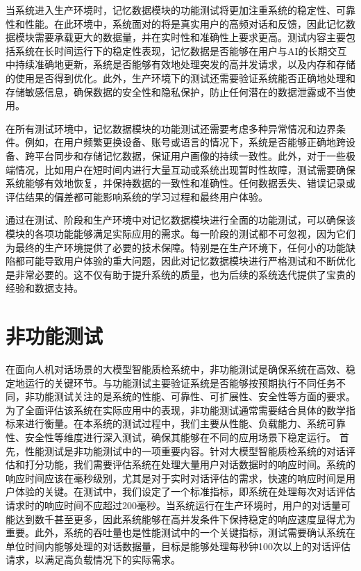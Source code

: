 当系统进入生产环境时，记忆数据模块的功能测试将更加注重系统的稳定性、可靠性和性能。在此环境中，系统面对的将是真实用户的高频对话和反馈，因此记忆数据模块需要承载更大的数据量，并在实时性和准确性上要求更高。测试内容主要包括系统在长时间运行下的稳定性表现，记忆数据是否能够在用户与AI的长期交互中持续准确地更新，系统是否能够有效地处理突发的高并发请求，以及内存和存储的使用是否得到优化。此外，生产环境下的测试还需要验证系统能否正确地处理和存储敏感信息，确保数据的安全性和隐私保护，防止任何潜在的数据泄露或不当使用。

在所有测试环境中，记忆数据模块的功能测试还需要考虑多种异常情况和边界条件。例如，在用户频繁更换设备、账号或语言的情况下，系统是否能够正确地跨设备、跨平台同步和存储记忆数据，保证用户画像的持续一致性。此外，对于一些极端情况，比如用户在短时间内进行大量互动或系统出现暂时性故障，测试需要确保系统能够有效地恢复，并保持数据的一致性和准确性。任何数据丢失、错误记录或评估结果的偏差都可能影响系统的学习过程和最终用户体验。

通过在测试、阶段和生产环境中对记忆数据模块进行全面的功能测试，可以确保该模块的各项功能能够满足实际应用的需求。每一阶段的测试都不可忽视，因为它们为最终的生产环境提供了必要的技术保障。特别是在生产环境下，任何小的功能缺陷都可能导致用户体验的重大问题，因此对记忆数据模块进行严格测试和不断优化是非常必要的。这不仅有助于提升系统的质量，也为后续的系统迭代提供了宝贵的经验和数据支持。
\section{非功能测试}
在面向人机对话场景的大模型智能质检系统中，非功能测试是确保系统在高效、稳定地运行的关键环节。与功能测试主要验证系统是否能够按预期执行不同任务不同，非功能测试关注的是系统的性能、可靠性、可扩展性、安全性等方面的要求。为了全面评估该系统在实际应用中的表现，非功能测试通常需要结合具体的数学指标来进行衡量。在本系统的测试过程中，我们主要从性能、负载能力、系统可靠性、安全性等维度进行深入测试，确保其能够在不同的应用场景下稳定运行。
首先，性能测试是非功能测试中的一项重要内容。针对大模型智能质检系统的对话评估和打分功能，我们需要评估系统在处理大量用户对话数据时的响应时间。系统的响应时间应该在毫秒级别，尤其是对于实时对话评估的需求，快速的响应时间是用户体验的关键。在测试中，我们设定了一个标准指标，即系统在处理每次对话评估请求时的响应时间不应超过200毫秒。当系统运行在生产环境时，用户的对话量可能达到数千甚至更多，因此系统能够在高并发条件下保持稳定的响应速度显得尤为重要。此外，系统的吞吐量也是性能测试中的一个关键指标，测试需要确认系统在单位时间内能够处理的对话数据量，目标是能够处理每秒钟100次以上的对话评估请求，以满足高负载情况下的实际需求。

